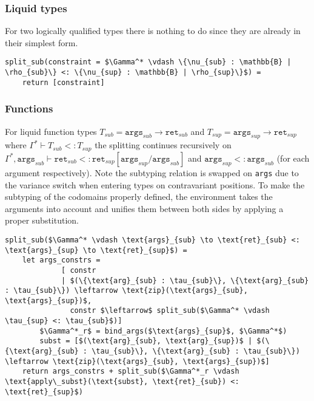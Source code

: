 \subsubsection{Liquid types}

For two logically qualified types there is nothing to do since they are already
in their simplest form.

\begin{lstlisting}[language=pseudocode]
split_sub(constraint = $\Gamma^* \vdash \{\nu_{sub} : \mathbb{B} | \rho_{sub}\} <: \{\nu_{sup} : \mathbb{B} | \rho_{sup}\}$) =
    return [constraint]
\end{lstlisting}

\subsubsection{Functions}

For liquid function types $T_{sub} = \texttt{args}_{sub} \to \texttt{ret}_{sub}$
and $T_{sup} = \texttt{args}_{sup} \to \texttt{ret}_{sup}$ where $\Gamma^* \vdash
T_{sub} <: T_{sup}$ the splitting continues recursively on $\Gamma^*,
\texttt{args}_{sub} \vdash \texttt{ret}_{sub} <:
\texttt{ret}_{sup}[\texttt{args}_{sup} / \texttt{args}_{sub}]$ and
$\texttt{args}_{sup} <: \texttt{args}_{sub}$ (for each argument respectively).
Note the subtyping relation is swapped on \texttt{args} due to the variance
switch when entering types on contravariant positions. To make the subtyping of
the codomains properly defined, the environment takes the arguments into account
and unifies them between both sides by applying a proper substitution.

\begin{lstlisting}[language=pseudocode]
split_sub($\Gamma^* \vdash \text{args}_{sub} \to \text{ret}_{sub} <: \text{args}_{sup} \to \text{ret}_{sup}$) =
    let args_constrs =
             [ constr
             | $(\{\text{arg}_{sub} : \tau_{sub}\}, \{\text{arg}_{sub} : \tau_{sub}\}) \leftarrow \text{zip}(\text{args}_{sub}, \text{args}_{sup})$,
               constr $\leftarrow$ split_sub($\Gamma^* \vdash \tau_{sup} <: \tau_{sub}$)]
        $\Gamma^*_r$ = bind_args($\text{args}_{sup}$, $\Gamma^*$)
        subst = [$(\text{arg}_{sub}, \text{arg}_{sup})$ | $(\{\text{arg}_{sub} : \tau_{sub}\}, \{\text{arg}_{sub} : \tau_{sub}\}) \leftarrow \text{zip}(\text{args}_{sub}, \text{args}_{sup})$]
    return args_constrs + split_sub($\Gamma^*_r \vdash \text{apply\_subst}(\text{subst}, \text{ret}_{sub}) <: \text{ret}_{sup}$)

\end{lstlisting}

